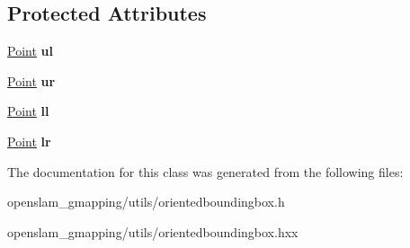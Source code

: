 \subsection*{Protected Attributes}
\begin{DoxyCompactItemize}
\item 
\mbox{\label{classGMapping_1_1OrientedBoundingBox_a701eb8067d1aa577b851606606e9d088}} 
\hyperlink{structGMapping_1_1point}{Point} {\bfseries ul}
\item 
\mbox{\label{classGMapping_1_1OrientedBoundingBox_ad4f111865235485ea50c00686fc599e9}} 
\hyperlink{structGMapping_1_1point}{Point} {\bfseries ur}
\item 
\mbox{\label{classGMapping_1_1OrientedBoundingBox_a17c2c28c84ef7e17c173fa97e97e2cc6}} 
\hyperlink{structGMapping_1_1point}{Point} {\bfseries ll}
\item 
\mbox{\label{classGMapping_1_1OrientedBoundingBox_ac6ea5725a6fdc642e9cbe590ecbfe543}} 
\hyperlink{structGMapping_1_1point}{Point} {\bfseries lr}
\end{DoxyCompactItemize}


The documentation for this class was generated from the following files\+:\begin{DoxyCompactItemize}
\item 
openslam\+\_\+gmapping/utils/orientedboundingbox.\+h\item 
openslam\+\_\+gmapping/utils/orientedboundingbox.\+hxx\end{DoxyCompactItemize}
